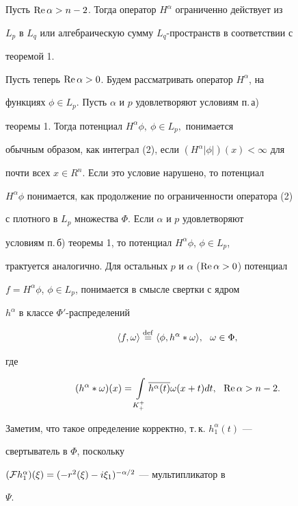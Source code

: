 Пусть $\operatorname{Re}\alpha>n-2$. Тогда оператор $H^\alpha$ ограниченно действует из


$L_p$ в $L_q$ или алгебраическую сумму $L_q$-пространств в соответствии с


теоремой 1.





Пусть теперь $\operatorname{Re}\alpha>0$. Будем рассматривать оператор $H^\alpha$, на


функциях $\phi\in L_p$. Пусть $\alpha$ и $p$ удовлетворяют условиям п.\,а)


теоремы 1. Тогда потенциал $H^\alpha\phi,\ \phi\in L_p,$ понимается


обычным образом, как интеграл (2), если $(H^\alpha|\phi|)(x)<\infty$ для


почти всех $x\in R^n$. Если это условие нарушено, то потенциал


$H^\alpha\phi$ понимается, как продолжение по ограниченности оператора (2)


с плотного в $L_p$ множества $\Phi$. Если $\alpha$ и $p$ удовлетворяют


условиям п.\,б) теоремы 1, то потенциал $H^\alpha\phi$, $\phi\in L_p$,


трактуется аналогично. Для остальных $p$ и $\alpha$ ($\operatorname{Re}\alpha>0$) потенциал


$f=H^\alpha\phi$, $\phi\in L_p$, понимается в смысле свертки с ядром


$h^\alpha$ в классе ${\Phi}'$-распределений


$$


\la f,\omega\ra\overset{\mathrm{def}}{=}{}\la\phi,h^\alpha*\omega\ra,


\ \ \omega\in{\Phi},


$$


где


$$


(h^\alpha*\omega)(x)=\int\limits_{K_+^+}\overline{h^\alpha(t)}\omega(x+t)dt,


\ \ \R\alpha > n-2.


$$


Заметим, что такое определение корректно, т.\,к. $h_1^{\alpha}(t)$ ---


свертыватель в ${\Phi}$, поскольку


$({\cal F} h_1^\alpha)(\xi)=(-r^2(\xi)-i\xi_1)^{-\alpha/2}$ --- мультипликатор в


$\Psi$.






